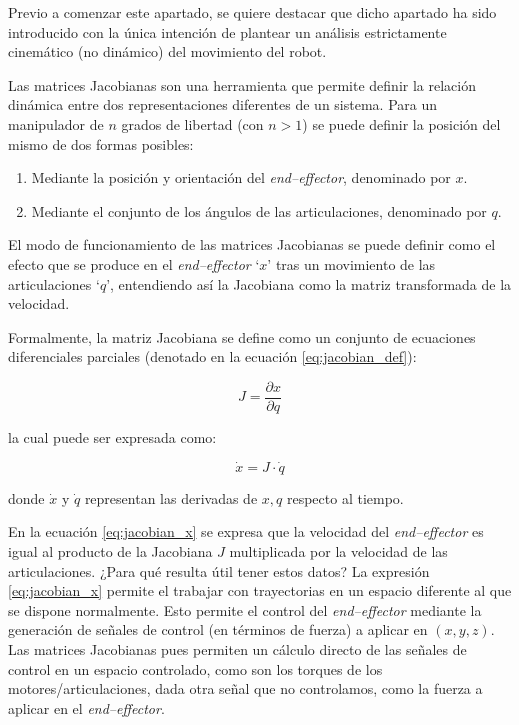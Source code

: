Previo a comenzar este apartado, se quiere destacar que dicho apartado ha sido
introducido con la única intención de plantear un análisis estrictamente cinemático
(no dinámico) del movimiento del robot.

Las matrices Jacobianas son una herramienta que permite definir la relación
dinámica entre dos representaciones diferentes de un sistema. Para un manipulador
de $n$ grados de libertad (con $n > 1$) se puede definir la posición del mismo de dos
formas posibles:

\begin{enumerate}
    \item Mediante la posición y orientación del \textit{end--effector}, denominado por $x$.
    \item Mediante el conjunto de los ángulos de las articulaciones, denominado por $q$.
\end{enumerate}

El modo de funcionamiento de las matrices Jacobianas se puede definir como el efecto
que se produce en el \textit{end--effector} `$x$' tras un movimiento de las articulaciones
`$q$', entendiendo así la Jacobiana como la matriz transformada de la velocidad.

Formalmente, la matriz Jacobiana se define como un conjunto de ecuaciones diferenciales
parciales (denotado en la ecuación \ref{eq:jacobian_def}):

\begin{equation}\label{eq:jacobian_def}
    J = \frac{\partial x}{\partial q}
\end{equation}

la cual puede ser expresada como:

\begin{equation}\label{eq:jacobian_x}
    \dot{x} = J \cdot \dot{q}
\end{equation}

donde $\dot{x}$ y $\dot{q}$ representan las derivadas de $x, q$ respecto al tiempo.

En la ecuación \ref{eq:jacobian_x} se expresa que la velocidad del \textit{end--effector}
es igual al producto de la Jacobiana $J$ multiplicada por la velocidad de las articulaciones.
¿Para qué resulta útil tener estos datos? La expresión \ref{eq:jacobian_x} permite el
trabajar con trayectorias en un espacio diferente al que se dispone normalmente\cite{travisdewolfRobotControlPart2013a}.
Esto permite el control del \textit{end--effector} mediante la
generación de señales de control (en términos de fuerza) a aplicar en $\left(x, y, z\right)$.
Las matrices Jacobianas pues permiten un cálculo directo de las señales de control en un
espacio controlado, como son los torques de los motores/articulaciones, dada otra señal
que no controlamos, como la fuerza a aplicar en el \textit{end--effector}.

